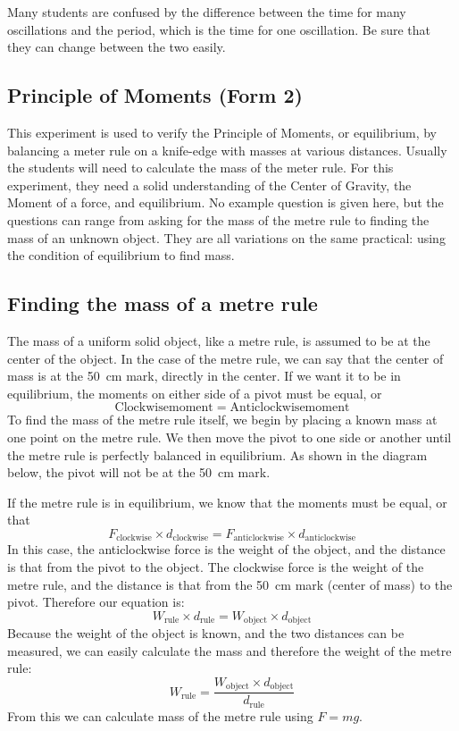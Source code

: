 Many students are confused by the difference between the time for many oscillations and
the period, which is the time for one oscillation. Be sure that they can change between
the two easily.

\subsection{Principle of Moments (Form 2)}

This experiment is used to verify the Principle of Moments, or equilibrium, by
balancing a meter rule on a knife-edge with masses at various distances. Usually the
students will need to calculate the mass of the meter rule. For this experiment, they need
a solid understanding of the Center of Gravity, the Moment of a force, and equilibrium.
No example question is given here, but the questions can range from asking for
the mass of the metre rule to finding the mass of an unknown object. They are all
variations on the same practical: using the condition of equilibrium to find mass.

\subsection{Finding the mass of a metre rule}

The mass of a uniform solid object, like a metre rule, is assumed to be at the
center of the object. In the case of the metre rule, we can say that the center of mass is at
the 50~cm mark, directly in the center. If we want it to be in equilibrium, the moments on
either side of a pivot must be equal, or $$ \mathrm{Clockwise moment} = \mathrm{Anticlockwise moment}$$
To find the mass of the metre rule itself, we begin by placing a known mass at one
point on the metre rule. We then move the pivot to one side or another until the metre
rule is perfectly balanced in equilibrium. As shown in the diagram below, the pivot will
not be at the 50~cm mark.

If the metre rule is in equilibrium, we know that the moments must be equal, or
that $$F_{\mathrm{clockwise}} \times d_{\mathrm{clockwise}} = F_{\mathrm{anticlockwise}} \times d_{\mathrm{anticlockwise}}$$
In this case, the anticlockwise force is the weight of the object, and the distance is that
from the pivot to the object. The clockwise force is the weight of the metre rule, and the
distance is that from the 50~cm mark (center of mass) to the pivot. Therefore our
equation is: $$ W_{\mathrm{rule}} \times d_{\mathrm{rule}} = W_{\mathrm{object}} \times d_{\mathrm{object}} $$
Because the weight of the object is known, and the two distances can be measured, we
can easily calculate the mass and therefore the weight of the metre rule:
$$W_{\mathrm{rule}} = \frac{W_{\mathrm{object}} \times d_{\mathrm{object}}}{d_{\mathrm{rule}}}$$
From this we can calculate mass of the metre rule using $F = mg$.

